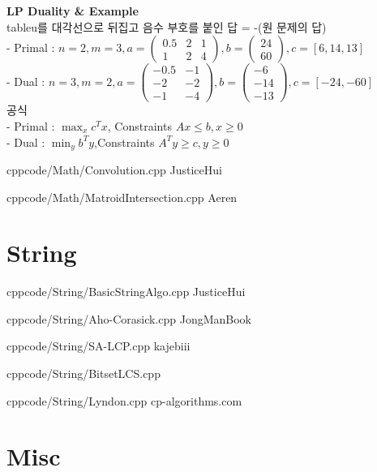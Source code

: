 \documentclass[landscape, 8pt, a4paper, oneside, twocolumn]{extarticle}
\begin{document}
\noindent
\textbf{LP Duality \& Example}\\
tableu를 대각선으로 뒤집고 음수 부호를 붙인 답 = -(원 문제의 답)\\
- Primal : $n = 2, m = 3, a = \begin{pmatrix} 0.5 & 2 & 1 \\ 1 & 2 & 4 \end{pmatrix}, b = \begin{pmatrix} 24 \\ 60 \end{pmatrix}, c = [6, 14, 13]$\\
- Dual : $n = 3, m = 2, a = \begin{pmatrix} -0.5 & -1 \\ -2 & -2 \\ -1 & -4 \end{pmatrix}, b = \begin{pmatrix} -6 \\ -14 \\ -13 \end{pmatrix}, c = [-24, -60]$\\
공식\\
- Primal : $\max_{x} c^Tx$, Constraints $Ax \leq b, x \geq 0$\\
- Dual : $\min_{y} b^Ty$,Constraints $A^Ty \geq c, y \geq 0$ 


{}{}
{cpp}{code/Math/Convolution.cpp}
{JusticeHui}

{}{}
{cpp}{code/Math/MatroidIntersection.cpp}
{Aeren}

\section{String}

{}{}
{cpp}{code/String/BasicStringAlgo.cpp}
{JusticeHui}

{}{}
{cpp}{code/String/Aho-Corasick.cpp}
{JongManBook}

{}{}
{cpp}{code/String/SA-LCP.cpp}
{kajebiii}

{}{}
{cpp}{code/String/BitsetLCS.cpp}

{}{}
{cpp}{code/String/Lyndon.cpp}
{cp-algorithms.com}

\section{Misc}
\end{document}
